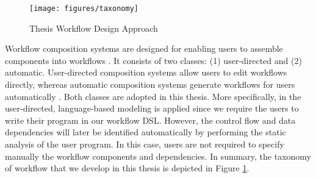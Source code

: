 \begin{figure}[here]
\centering
\texttt{[image: figures/taxonomy]}
\caption{Thesis Workflow Design Approach}
\label{fig:Taxonomy}
\end{figure}

Workflow composition systems are designed for enabling users to assemble components into workflows \cite{yu2005taxonomy}. It consists of two classes: (1) user-directed and (2) automatic.  User-directed composition systems allow users to edit workflows directly, whereas automatic composition systems generate workflows for users automatically \cite{yu2005taxonomy}. Both classes are adopted in this thesis. More specifically, in the user-directed, language-based modeling is applied since we require the users to write their program in our workflow DSL. However, the control flow and data dependencies will later be identified automatically by performing the static analysis of the user program. In this case, users are not required to specify manually the workflow components and dependencies. In summary, the taxonomy of workflow that we develop in this thesis is depicted in Figure \ref{fig:Taxonomy}.

